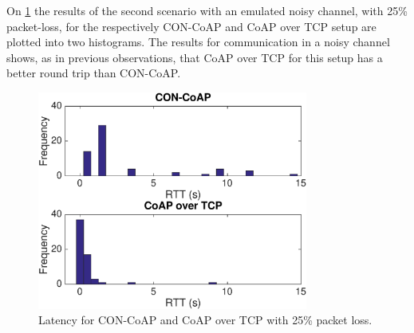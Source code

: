 


On \figurename{\ref{fig:latencynoisy}} the results of the second scenario with an emulated noisy channel, with 25\% packet-loss, for the respectively CON-CoAP and CoAP over TCP setup are plotted into two histograms.
The results for communication in a noisy channel shows, as in previous observations, that CoAP over TCP for this setup has a better round trip than CON-CoAP. %
\begin{figure}[bht]
	\centering
	\includegraphics[width=3.5in]{gfx/latencynoise}
	\caption{Latency for CON-CoAP and CoAP over TCP with 25\% packet loss.}
	\label{fig:latencynoisy}
\end{figure}


